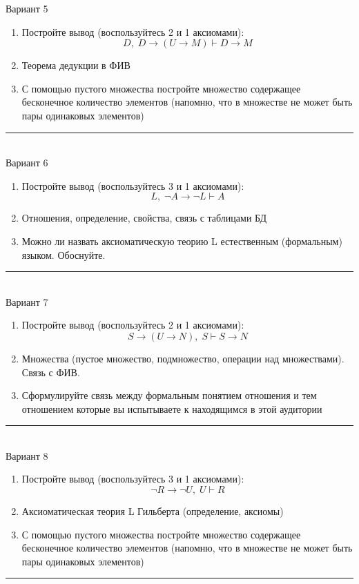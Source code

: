 \documentclass[10pt,a4paper]{article}
\begin{document}
\begin{multicols}{2}
\columnbreak\vfill

Вариант 5
\begin{enumerate}
\item Постройте вывод (воспользуйтесь 2 и 1 аксиомами): $$D,\;D\to(U\to M) \vdash D\to M$$
\item Теорема дедукции в ФИВ
\item С помощью пустого множества постройте множество содержащее бесконечное количество элементов (напомню, что в множестве не может быть пары одинаковых элементов)
\end{enumerate}
\noindent\rule{\columnwidth}{0.1pt} \\
    


Вариант 6
\begin{enumerate}
\item Постройте вывод (воспользуйтесь 3 и 1 аксиомами): $$L,\; \neg A \to \neg L \vdash A$$
\item Отношения, определение, свойства, связь с таблицами БД
\item Можно ли назвать аксиоматическую теорию L естественным (формальным) языком. Обоснуйте.
\end{enumerate}
\noindent\rule{\columnwidth}{0.1pt} \\
    


Вариант 7
\begin{enumerate}
\item Постройте вывод (воспользуйтесь 2 и 1 аксиомами): $$S\to(U\to N),\;S \vdash S\to N$$
\item Множества (пустое множество, подмножество, операции над множествами). Связь с ФИВ.
\item Сформулируйте связь между формальным понятием отношения и тем отношением которые вы испытываете к находящимся в этой аудитории
\end{enumerate}
\noindent\rule{\columnwidth}{0.1pt} \\
    


Вариант 8
\begin{enumerate}
\item Постройте вывод (воспользуйтесь 3 и 1 аксиомами): $$\neg R \to \neg U,\; U \vdash R$$
\item Аксиоматическая теория L Гильберта (определение, аксиомы)
\item С помощью пустого множества постройте множество содержащее бесконечное количество элементов (напомню, что в множестве не может быть пары одинаковых элементов)
\end{enumerate}
\noindent\rule{\columnwidth}{0.1pt} \\


\end{multicols}
\end{document}
